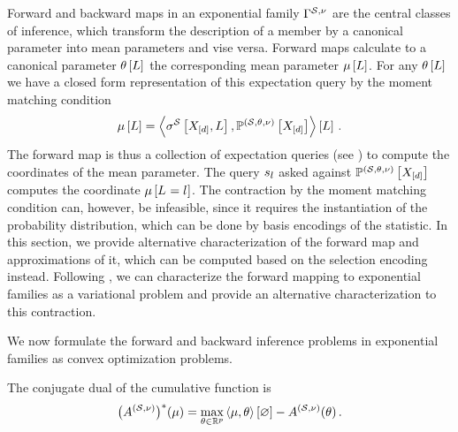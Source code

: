 

Forward and backward maps in an exponential family $\Gamma^{\mathcal{S},\nu}$ are the central classes of inference, which transform the description of a member by a canonical parameter into mean parameters and vise versa.
Forward maps calculate to a canonical parameter $\theta\left[L\right]$ the corresponding mean parameter $\mu\left[L\right]$.
For any $\theta\left[L\right]$ we have a closed form representation of this expectation query by the moment matching condition
\begin{align*}
    \mu\left[L\right] = \left\langle \sigma^{\mathcal{S}}\left[X_{[d]},L\right],\mathbb{P}^{(\mathcal{S},\theta,\nu)}\left[X_{[d]}\right]\right\rangle \left[ L \right] \, .
\end{align*}
The forward map is thus a collection of expectation queries (see ) to compute the coordinates of the mean parameter.
The query $s_{l}$ asked against $\mathbb{P}^{(\mathcal{S},\theta,\nu)}\left[X_{[d]}\right]$ computes the coordinate $\mu\left[L_{}=l_{}\right]$.
The contraction by the moment matching condition can, however, be infeasible, since it requires the instantiation of the probability distribution, which can be done by basis encodings of the statistic.
In this section, we provide alternative characterization of the forward map and approximations of it, which can be computed based on the selection encoding instead.
Following \cite{wainwright_graphical_2008}, we can characterize the forward mapping to exponential families as a variational problem and provide an alternative characterization to this contraction.



We now formulate the forward and backward inference problems in exponential families as convex optimization problems.

The conjugate dual of the cumulative function is
\begin{align*}
    \big(A^{(\mathcal{S},\nu)}\big)^*(\mu) = \max_{\theta\in\mathbb{R}^{p}} \left\langle \mu,\theta\right\rangle \left[ \varnothing \right] - A^{(\mathcal{S},\nu)}(\theta) \, .
\end{align*}

